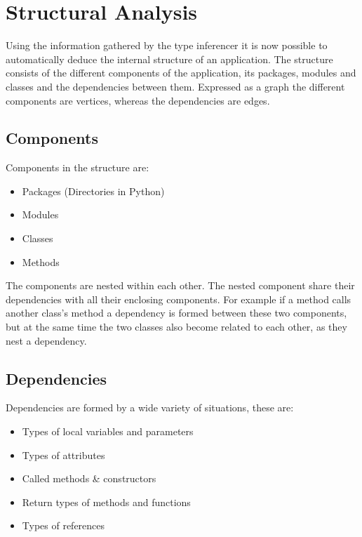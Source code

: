 \documentclass[12pt,halfparskip,DIV11,BCOR10mm]{scrreprt}
\begin{document}
\chapter{Structural Analysis}

Using the information gathered by the type inferencer it is now possible to automatically deduce the internal structure of an application. The structure consists of the different components of the application, its packages, modules and classes and the dependencies between them. Expressed as a graph the different components are vertices, whereas the dependencies are edges.

\section{Components}

Components in the structure are:

\begin{itemize}
    \item Packages (Directories in Python)
    \item Modules
    \item Classes
    \item Methods
\end{itemize}

The components are nested within each other. The nested component share their dependencies with all their enclosing components. For example if a method calls another class's method a dependency is formed between these two components, but at the same time the two classes also become related to each other, as they nest a dependency. 

\section{Dependencies}

Dependencies are formed by a wide variety of situations, these are:

\begin{itemize}
    \item Types of local variables and parameters
    \item Types of attributes
    \item Called methods \& constructors
    \item Return types of methods and functions
    \item Types of references
\end{itemize}
\end{document}
